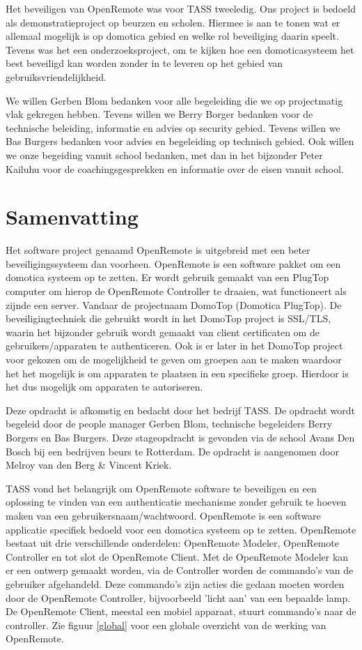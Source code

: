 \documentclass[]{article}
\begin{document}
Het beveiligen van OpenRemote was voor TASS tweeledig. Ons project is bedoeld als
demonstratieproject op beurzen en scholen. Hiermee is aan te tonen wat er
allemaal mogelijk is op domotica gebied en welke rol beveiliging daarin speelt.
Tevens was het een onderzoeksproject, om te kijken hoe een domoticasysteem
het best beveiligd kan worden zonder in te leveren op het gebied van
gebruiksvriendelijkheid.

We willen Gerben Blom bedanken voor alle begeleiding die we op projectmatig vlak
gekregen hebben. Tevens willen we Berry Borger bedanken voor de technische
beleiding, informatie en advies op security gebied. Tevens willen we Bas Burgers
bedanken voor advies en begeleiding op technisch gebied. Ook willen we onze
begeiding vanuit school bedanken, met dan in het bijzonder Peter Kailuhu voor
de coachingsgesprekken en informatie over de eisen vanuit school.

\newpage
\tableofcontents
\newpage
\listoftables
\listoffigures

\newpage
\section*{Samenvatting}
Het software project genaamd OpenRemote is uitgebreid met een beter
beveiligingssysteem dan voorheen. OpenRemote is een software
pakket om een domotica systeem op te zetten. Er wordt gebruik gemaakt van
een PlugTop computer om hierop de OpenRemote Controller te draaien, wat functioneert als
zijnde een server. Vandaar de projectnaam DomoTop (Domotica PlugTop).
De beveiligingtechniek die gebruikt wordt in het DomoTop project is SSL/TLS,
waarin het bijzonder gebruik wordt gemaakt van client certificaten om de
gebruikers/apparaten te authenticeren. Ook is er later in het DomoTop project
voor gekozen om de mogelijkheid te geven om groepen aan te maken waardoor
het het mogelijk is om apparaten te plaatsen in een specifieke groep. Hierdoor
is het dus mogelijk om apparaten te autoriseren.

Deze opdracht is afkomstig en bedacht door het bedrijf TASS. De opdracht wordt
begeleid door de people manager Gerben Blom, technische begeleiders Berry
Borgers en Bas Burgers. Deze stageopdracht is gevonden via de school Avans Den
Bosch bij een bedrijven beurs te Rotterdam. De opdracht is aangenomen door
Melroy van den Berg \& Vincent Kriek.

TASS vond het belangrijk om OpenRemote software te beveiligen en een oplossing
te vinden van een authenticatie mechanisme zonder gebruik te hoeven maken van
een gebruikersnaam/wachtwoord. OpenRemote is een software
applicatie specifiek bedoeld voor een domotica systeem op te zetten. OpenRemote
bestaat uit drie verschillende onderdelen: OpenRemote Modeler, OpenRemote
Controller en tot slot de OpenRemote Client. Met de OpenRemote Modeler kan er een ontwerp
gemaakt worden, via de Controller worden de commando's van de gebruiker
afgehandeld. Deze commando's zijn acties die gedaan moeten worden door de
OpenRemote Controller, bijvoorbeeld 'licht aan' van een bepaalde lamp. De OpenRemote Client, meestal een mobiel apparaat, stuurt
commando's naar de controller. Zie figuur \ref{global} voor een globale overzicht van de
werking van OpenRemote.
\end{document}
